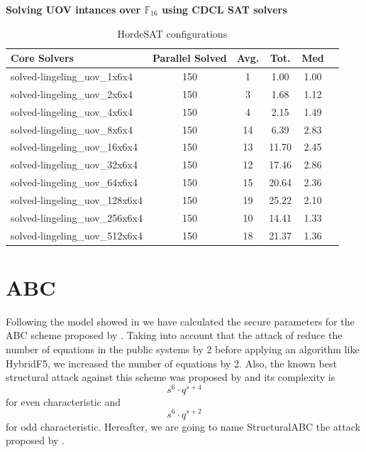\noindent
\textbf{Solving UOV intances over $\mathbb{F}_{16}$ using CDCL SAT solvers}
\begin{table}[]
\centering
\caption{HordeSAT configurations}
\label{my-label}
\begin{tabular}{lccccc}
\hline
\multicolumn{1}{l|}{Core Solvers} & \multicolumn{1}{c|}{Parallel Solved} & \multicolumn{1}{c|}{Avg.} & \multicolumn{1}{c|}{Tot.} & \multicolumn{1}{c}{Med} \\ \hline
solved-lingeling\_uov\_1x6x4 & 150 & 1 & 1.00 & 1.00 \\\hline
solved-lingeling\_uov\_2x6x4 & 150 & 3 & 1.68 & 1.12  \\\hline
solved-lingeling\_uov\_4x6x4 & 150 & 4 & 2.15 & 1.49 \\\hline
solved-lingeling\_uov\_8x6x4 & 150  & 14 & 6.39 & 2.83 \\\hline
solved-lingeling\_uov\_16x6x4 & 150  & 13 & 11.70 & 2.45  \\\hline
solved-lingeling\_uov\_32x6x4 & 150 & 12 & 17.46 & 2.86 \\\hline
solved-lingeling\_uov\_64x6x4 & 150 & 15 & 20.64 & 2.36 \\\hline
solved-lingeling\_uov\_128x6x4 & 150 & 19 & 25.22 & 2.10 \\\hline
solved-lingeling\_uov\_256x6x4 & 150  & 10 & 14.41 & 1.33  \\\hline
solved-lingeling\_uov\_512x6x4 & 150  & 18 & 21.37 & 1.36  \\\hline
\end{tabular}
\end{table}



\section{ABC}
Following the model showed in \cite{AlbrechtPetzoldt2013} we have calculated the secure parameters for the ABC scheme proposed by \cite{Tao2015}. Taking into account that the attack of \cite{Thomae2012}  reduce the number of equations in the public systems by 2 before applying an algorithm like HybridF5, we increased the number of equations by 2. Also, the known best structural attack against this scheme was proposed by \cite{Moody2014} and its complexity is 
\begin{equation}
s^6\cdot q^{s+4}
\label{eq:structural}
\end{equation}
for even characteristic and 
\begin{equation}
s^6\cdot q^{s+2}
\end{equation} for odd characteristic. 
Hereafter, we are going to name StructuralABC the attack proposed by \cite{Moody2014}. 

